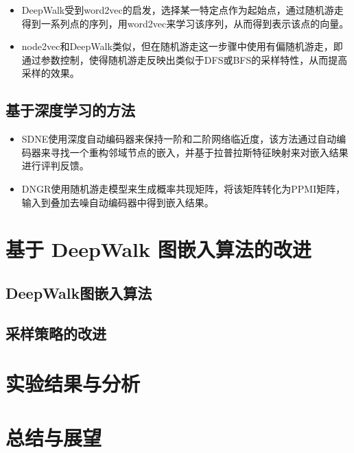 \documentclass{ctexart}
\begin{document}
\begin{itemize}
    \item DeepWalk受到word2vec的启发，选择某一特定点作为起始点，通过随机游走得到一系列点的序列，用word2vec来学习该序列，从而得到表示该点的向量。
    \item node2vec和DeepWalk类似，但在随机游走这一步骤中使用有偏随机游走，即通过参数控制，使得随机游走反映出类似于DFS或BFS的采样特性，从而提高采样的效果。
\end{itemize}

\subsection{基于深度学习的方法}
\begin{itemize}
    \item SDNE使用深度自动编码器来保持一阶和二阶网络临近度，该方法通过自动编码器来寻找一个重构邻域节点的嵌入，并基于拉普拉斯特征映射来对嵌入结果进行评判反馈。
    \item DNGR使用随机游走模型来生成概率共现矩阵，将该矩阵转化为PPMI矩阵，输入到叠加去噪自动编码器中得到嵌入结果。
\end{itemize}

\section{基于 DeepWalk 图嵌入算法的改进}

\subsection{DeepWalk图嵌入算法}

\subsection{采样策略的改进}

\section{实验结果与分析}

\section{总结与展望}




\end{document}

